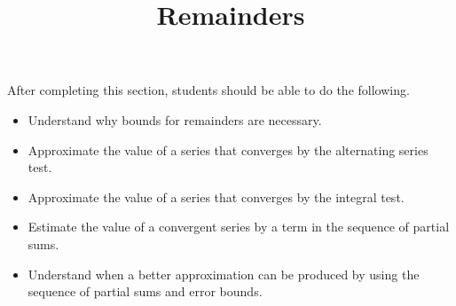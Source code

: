 \documentclass{ximera}
\title{Remainders}
\begin{document}
\begin{abstract}
\end{abstract}

\maketitle

\begin{sectionOutcomes}

After completing this section, students should be able to do the following.

\begin{itemize}
\item Understand why bounds for remainders are necessary.
\item Approximate the value of a series that converges by the alternating series test.
\item Approximate the value of a series that converges by the integral test.
\item Estimate the value of a convergent series by a term in the sequence of partial sums.
\item Understand when a better approximation can be produced by using the sequence of partial sums and error bounds.
\end{itemize}

\end{sectionOutcomes}
\end{document}
